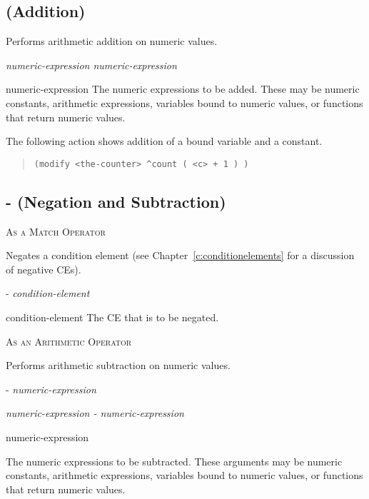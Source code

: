 \subsection{\co{+} (Addition)}

Performs arithmetic addition on numeric values.

\Format

\it{numeric-expression} \co{+} \it{numeric-expression}

\begin{operands}
\item[numeric-expression] The numeric expressions to be
  added. These may be numeric constants, arithmetic expressions,
  variables bound to numeric values, or functions that return numeric
  values.
\end{operands}

\Example

The following action shows addition of a bound variable and a
constant.

\begin{quote}
\begin{verbatim}
(modify <the-counter> ^count ( <c> + 1 ) )
\end{verbatim}
\end{quote}

\subsection{\co- (Negation and Subtraction)}

\textsc{As a Match Operator}

Negates a condition element (see Chapter~\ref{c:conditionelements} for
a discussion of negative CEs).

\Format

\co- \it{condition-element}

\begin{operands}
\item[condition-element] The CE that is to be negated.
\end{operands}

\textsc{As an Arithmetic Operator}

Performs arithmetic subtraction on numeric values.

\Format

\co- \it{numeric-expression}

\it{numeric-expression} \co- \it{numeric-expression}

\begin{operands}
\item[numeric-expression]

  The numeric expressions to be subtracted. These arguments may be
  numeric constants, arithmetic expressions, variables bound to
  numeric values, or functions that return numeric values.
\end{operands}
  
